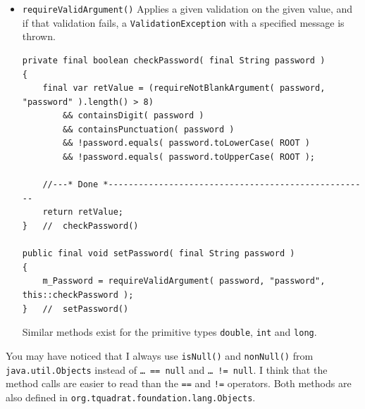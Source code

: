 \documentclass[11pt,a4paper, titlepage, parskip=half, headsepline, footsepline, cleardoublepage=current, headheight=1cm]{scrbook}
\begin{document}
\begin{itemize}
\item{\lstinline|requireValidArgument()|\autocite{TQUADRAT_ORG_FOUNDATION_OBJECTS:requireValidArgument} Applies a given validation on the given value, and if that validation fails, a \lstinline|ValidationException| with a specified message is thrown.
\begin{lstlisting}
private final boolean checkPassword( final String password )
{
    final var retValue = (requireNotBlankArgument( password, "password" ).length() > 8)
        && containsDigit( password )
        && containsPunctuation( password )
        && !password.equals( password.toLowerCase( ROOT )
        && !password.equals( password.toUpperCase( ROOT );
        	 
    //---* Done *----------------------------------------------------
    return retValue;
}   //  checkPassword()

public final void setPassword( final String password )
{
    m_Password = requireValidArgument( password, "password", this::checkPassword );
}   //  setPassword()
\end{lstlisting}

Similar methods exist for the primitive types \lstinline|double|, \lstinline|int| and \lstinline|long|.}
\end{itemize}

You may have noticed that I always use \lstinline|isNull()|\autocite{ORACLE_DOC_OBJECTS:isNull} and \lstinline|nonNull()|\autocite{ORACLE_DOC_OBJECTS:nonNull} from \lstinline|java.util.Objects| instead of \lstinline|… == null| and \lstinline|… != null|. I think that the method calls are easier to read than the \verb#==# and \verb#!=# operators. Both methods are also defined in \lstinline|org.tquadrat.foundation.lang.Objects|\autocite{TQUADRAT_ORG_FOUNDATION_OBJECTS}.
\end{document}
